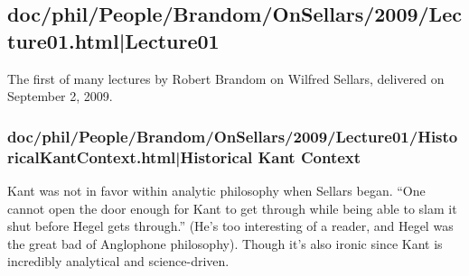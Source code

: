 \documentclass[12pt,a4paper]{report}
\begin{document}
\subsection{doc/phil/People/Brandom/OnSellars/2009/Lecture01.html|Lecture01}
The first of many lectures by Robert Brandom on Wilfred Sellars, delivered on September 2, 2009.

\subsubsection{doc/phil/People/Brandom/OnSellars/2009/Lecture01/HistoricalKantContext.html|Historical Kant Context}
Kant was not in favor within analytic philosophy when Sellars began. ``One cannot open the door enough for Kant to get through while being able to slam it shut before Hegel gets through.'' (He's too interesting of a reader, and Hegel was the great bad of Anglophone philosophy). Though it's also ironic since Kant is incredibly analytical and science-driven.
\end{document}
